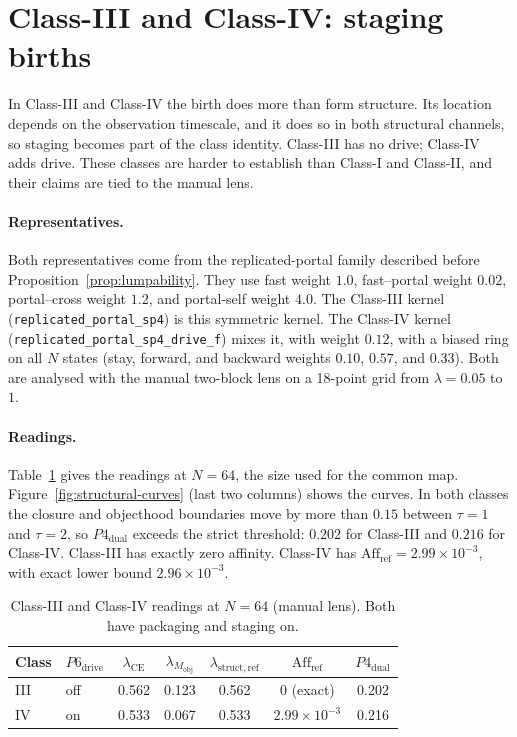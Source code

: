 \section{Class-III and Class-IV: staging births}
\label{sec:class-iii-iv}

In Class-III and Class-IV the birth does more than form structure. Its location depends on the observation timescale, and it does so in both structural channels, so staging becomes part of the class identity. Class-III has no drive; Class-IV adds drive. These classes are harder to establish than Class-I and Class-II, and their claims are tied to the manual lens.

\paragraph{Representatives.} Both representatives come from the replicated-portal family described before Proposition~\ref{prop:lumpability}. They use fast weight $1.0$, fast--portal weight $0.02$, portal--cross weight $1.2$, and portal-self weight $4.0$. The Class-III kernel (\texttt{replicated\_portal\_sp4}) is this symmetric kernel. The Class-IV kernel (\texttt{replicated\_portal\_sp4\_drive\_f}) mixes it, with weight $0.12$, with a biased ring on all $N$ states (stay, forward, and backward weights $0.10$, $0.57$, and $0.33$). Both are analysed with the manual two-block lens on a 18-point grid from $\lambda=0.05$ to $1$.

\paragraph{Readings.} Table~\ref{tab:class-iii-iv-summary} gives the readings at $N=64$, the size used for the common map. Figure~\ref{fig:structural-curves} (last two columns) shows the curves. In both classes the closure and objecthood boundaries move by more than $0.15$ between $\tau=1$ and $\tau=2$, so $P4_{\mathrm{dual}}$ exceeds the strict threshold: $0.202$ for Class-III and $0.216$ for Class-IV. Class-III has exactly zero affinity. Class-IV has $\mathrm{Aff}_{\mathrm{ref}}=2.99\times10^{-3}$, with exact lower bound $2.96\times10^{-3}$.

\begin{table}[tbp]
\centering
\small
\caption{Class-III and Class-IV readings at $N=64$ (manual lens). Both have packaging and staging on.}
\label{tab:class-iii-iv-summary}
\setlength{\tabcolsep}{5pt}
\begin{tabular}{@{}llccccc@{}}
\toprule
Class & $P6_{\mathrm{drive}}$
  & $\lambda_{\mathrm{CE}}$
  & $\lambda_{M_{\mathrm{obj}}}$
  & $\lambda_{\mathrm{struct,ref}}$
  & $\mathrm{Aff}_{\mathrm{ref}}$
  & $P4_{\mathrm{dual}}$ \\
\midrule
III & off & 0.562 & 0.123 & 0.562 & $0$ (exact)          & 0.202 \\
IV  & on  & 0.533 & 0.067 & 0.533 & $2.99\times 10^{-3}$ & 0.216 \\
\bottomrule
\end{tabular}
\end{table}

